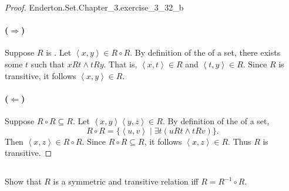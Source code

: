 \documentclass{report}
\newcommand{\pair}[1]{\left< #1 \right>}
\begin{document}
\begin{proof}

    {Enderton.Set.Chapter\_3.exercise\_3\_32\_b}

  \paragraph{($\Rightarrow$)}%

    Suppose $R$ is .
    Let $\pair{x, y} \in R \circ R$.
    By definition of the  of a set,
      there exists some $t$ such that $xRt \land tRy$.
    That is, $\pair{x, t} \in R$ and $\pair{t, y} \in R$.
    Since $R$ is transitive, it follows $\pair{x, y} \in R$.

  \paragraph{($\Leftarrow$)}%

    Suppose $R \circ R \subseteq R$.
    Let $\pair{x, y} \pair{y, z} \in R$.
    By definition of the  of a set,
      $$R \circ R = \{\pair{u, v} \mid \exists t(uRt \land tRv)\}.$$
    Then $\pair{x, z} \in R \circ R$.
    Since $R \circ R \subseteq R$, it follows $\pair{x, z} \in R$.
    Thus $R$ is transitive.

\end{proof}

\subsection{}%

Show that $R$ is a symmetric and transitive relation iff $R = R^{-1} \circ R$.
\end{document}
